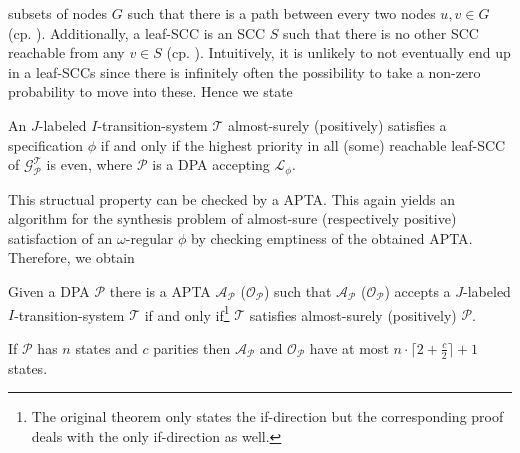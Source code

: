 subsets of nodes $G$ such that there is a path between every two nodes
$u,v\in G$ (cp. \cite{Tarjan}). Additionally, a leaf-\ac{SCC} is an \ac{SCC}
$S$ such that there is no other \ac{SCC} reachable from any $v\in S$ (cp.
\cite[Bottom-\ac{SCC}]{ComplexProbVerification}). Intuitively, it is unlikely
to not eventually end up in a leaf-\acp{SCC} since there is infinitely often
the possibility to take a non-zero probability to move into these. Hence we
state
\begin{lemma}
  \cite[Lemma 1]{SynProbEnv}
  An $J$-labeled $I$-transition-system $\mathcal{T}$ almost-surely (positively)
  satisfies a specification $\phi$ if and only if the highest priority in all
  (some) reachable leaf-\ac{SCC} of $\mathcal{G}_{\mathcal{P}}^{\mathcal{T}}$
  is even, where $\mathcal{P}$ is a \ac{DPA} accepting $\mathcal{L}_{\phi}$.
\end{lemma}
This structual property can be checked by a \ac{APTA}. This again yields an
algorithm for the synthesis problem of almost-sure (respectively positive)
satisfaction of an $\omega$-regular $\phi$ by checking emptiness of the
obtained \ac{APTA}. Therefore, we obtain
\begin{theorem}
  \cite[Theorem 1]{SynProbEnv}
  Given a \ac{DPA} $\mathcal{P}$ there is a \ac{APTA} 
  $\mathcal{A}_{\mathcal{P}}$ ($\mathcal{O}_{\mathcal{P}}$) such that 
  $\mathcal{A}_{\mathcal{P}}$ ($\mathcal{O}_{\mathcal{P}}$) accepts a 
  $J$-labeled $I$-transition-system $\mathcal{T}$ if and only 
  if\footnote{The original theorem only states the if-direction but the 
  corresponding proof deals with the only if-direction as well.} $\mathcal{T}$ 
  satisfies almost-surely (positively) $\mathcal{P}$.

  If $\mathcal{P}$ has $n$ states and $c$ parities then 
  $\mathcal{A}_{\mathcal{P}}$ and $\mathcal{O}_{\mathcal{P}}$ have at most
  $n\cdot\lceil 2 + \frac{c}{2}\rceil + 1$ states.
  \label{thm:probenvsynthesis}
\end{theorem}
